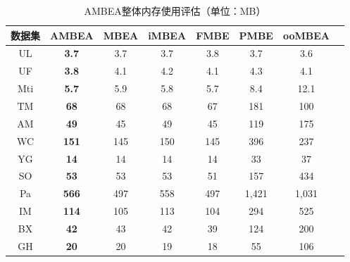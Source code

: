 \begin{table} [H]
	\centering    
	\setlength{\abovecaptionskip}{0cm}  
  \setlength{\belowcaptionskip}{-0.1cm}
	\caption{AMBEA整体内存使用评估（单位：MB）}      
	\label{tbl:ambea_memory}
	\setlength{\tabcolsep}{5pt}
	\begin{center}
				\normalsize{
		\begin{tabular}{|c|c|c|c|c|c|c|c|}
			\hline 

      \textbf{数据集} & \textbf{AMBEA} & \textbf{MBEA} & \textbf{iMBEA} & \textbf{FMBE} & \textbf{PMBE} & \textbf{ooMBEA} \\ \hline
      UL & \textbf{3.7} & 3.7 & 3.7 & 3.8 & 3.7 & 3.6 \\
      UF & \textbf{3.8} & 4.1 & 4.2 & 4.1 & 4.3 & 4.1 \\
      Mti & \textbf{5.7} & 5.9 & 5.8 & 5.7 & 8.4 & 12.1 \\
      TM & \textbf{68} & 68 & 68 & 67 & 181 & 100 \\
      AM & \textbf{49} & 45 & 49 & 45 & 119 & 175 \\
      WC & \textbf{151} & 145 & 150 & 145 & 396 & 237 \\
      YG & \textbf{14} & 14 & 14 & 14 & 33 & 37 \\
      SO & \textbf{53} & 53 & 53 & 51 & 157 & 434 \\
      Pa & \textbf{566} & 497 & 558 & 497 & 1,421 & 1,031 \\
      IM & \textbf{114} & 105 & 113 & 104 & 294 & 525 \\
      BX & \textbf{42} & 43 & 42 & 39 & 124 & 200 \\
      GH & \textbf{20} & 20 & 19 & 18 & 55 & 106 \\ \hline
		\end{tabular}
				}
	\end{center}

\end{table}
